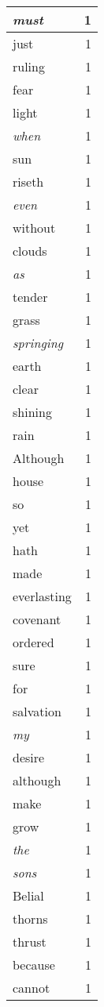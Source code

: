 \begin{center}
\begin{longtable}{l|r}
\emph{must} & 1 \\ \hline
just & 1 \\ \hline
ruling & 1 \\ \hline
fear & 1 \\ \hline
light & 1 \\ \hline
\emph{when} & 1 \\ \hline
sun & 1 \\ \hline
riseth & 1 \\ \hline
\emph{even} & 1 \\ \hline
without & 1 \\ \hline
clouds & 1 \\ \hline
\emph{as} & 1 \\ \hline
tender & 1 \\ \hline
grass & 1 \\ \hline
\emph{springing} & 1 \\ \hline
earth & 1 \\ \hline
clear & 1 \\ \hline
shining & 1 \\ \hline
rain & 1 \\ \hline
Although & 1 \\ \hline
house & 1 \\ \hline
so & 1 \\ \hline
yet & 1 \\ \hline
hath & 1 \\ \hline
made & 1 \\ \hline
everlasting & 1 \\ \hline
covenant & 1 \\ \hline
ordered & 1 \\ \hline
sure & 1 \\ \hline
for & 1 \\ \hline
salvation & 1 \\ \hline
\emph{my} & 1 \\ \hline
desire & 1 \\ \hline
although & 1 \\ \hline
make & 1 \\ \hline
grow & 1 \\ \hline
\emph{the} & 1 \\ \hline
\emph{sons} & 1 \\ \hline
Belial & 1 \\ \hline
thorns & 1 \\ \hline
thrust & 1 \\ \hline
because & 1 \\ \hline
cannot & 1 \\ \hline

\end{longtable}
\end{center}
